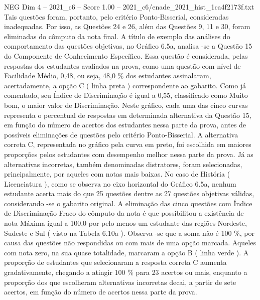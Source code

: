 \begin{textsample}{NEG Dim 4 – 2021\_c6 – Score 1.00 – 2021\_c6/enade\_2021\_hist\_1ca4f2173f.txt}
Tais questões foram, portanto, pelo critério Ponto-Bisserial, consideradas inadequadas.
Por isso, as Questões 24 e 26, além das Questões 9, 11 e 30, foram eliminadas do cômputo da nota final.
A título de exemplo das análises do comportamento das questões objetivas, no Gráfico 6.5a, analisa -se a Questão 15 do Componente de Conhecimento Específico.
Essa questão é considerada, pelas respostas dos estudantes avaliados na prova, como uma questão com nível de Facilidade Médio, 0,48, ou seja, 48,0 \% dos estudantes assinalaram, acertadamente, a opção C ( linha preta ) correspondente ao gabarito.
Como já comentado, seu Índice de Discriminação é igual a 0,55, classificado como Muito bom, o maior valor de Discriminação.
Neste gráfico, cada uma das cinco curvas representa o percentual de respostas em determinada alternativa da Questão 15, em função do número de acertos dos estudantes nessa parte da prova, antes de possíveis eliminações de questões pelo critério Ponto-Bisserial.
A alternativa correta C, representada no gráfico pela curva em preto, foi escolhida em maiores proporções pelos estudantes com desempenho melhor nessa parte da prova.
Já as alternativas incorretas, também denominadas distratores, foram selecionadas, principalmente, por aqueles com notas mais baixas.
No caso de História ( Licenciatura ), como se observa no eixo horizontal do Gráfico 6.5a, nenhum estudante acerta mais do que 25 questões dentre as 27 questões objetivas válidas, considerando -se o gabarito original.
A eliminação das cinco questões com Índice de Discriminação Fraco do cômputo da nota é que possibilitou a existência de nota Máxima igual a 100,0 por pelo menos um estudante das regiões Nordeste, Sudeste e Sul ( visto na Tabela 6.10a ).
Observa -se que a soma não é 100 \%, por causa das questões não respondidas ou com mais de uma opção marcada.
Aqueles com nota zero, na sua quase totalidade, marcaram a opção B ( linha verde ).
A proporção de estudantes que selecionaram a resposta correta C aumenta gradativamente, chegando a atingir 100 \% para 23 acertos ou mais, enquanto a proporção dos que escolheram alternativas incorretas decai, a partir de sete acertos, em função do número de acertos nessa parte da prova.

\end{textsample}
